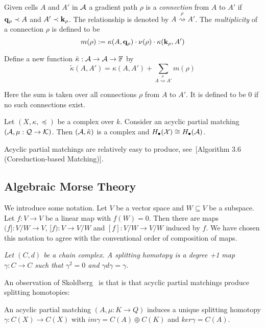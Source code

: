 Given cells $A$ and $A'$ in ${\mathcal A}$ a gradient path $\rho$ is a {\em connection} from $A$ to $A'$ if ${\bf q}_\rho\prec A$ and $A'\prec {\bf k}_\rho$.  The relationship is denoted by $A\stackrel{\rho}{\rightsquigarrow} A'$.  The {\em multiplicity} of a connection $\rho$ is defined to be $$m(\rho):= \kappa(A,{\bf q}_\rho)\cdot \nu(\rho)\cdot \kappa({\bf k}_\rho,A')$$

Define a new function $\tilde \kappa:{\mathcal A}\to {\mathcal A}\to {\mathbb{F}}$ by $$\tilde\kappa (A,A')=\kappa(A,A')+\sum_{A\stackrel{\rho}{\rightsquigarrow} A'} m(\rho)$$

Here the sum is taken over all connections $\rho$ from $A$ to $A'$.  It is defined to be 0 if no such connections exist.

\begin{prop}
Let $(X,\kappa,\preceq)$ be a complex over $k$.  Consider an acyclic partial matching $({\mathcal A},\mu:{\mathcal Q}\to {\mathcal K})$.  Then $({\mathcal A},\tilde \kappa)$ is a complex and $H_\bullet({\mathcal X})\cong H_\bullet({\mathcal A})$.
\end{prop}

Acyclic partial matchings are relatively easy to produce, see~[Algorithm 3.6 (Coreduction-based Matching)]\cite{focm}.
 

 
 \subsection{Algebraic Morse Theory}
 
 We introduce some notation.  Let $V$ be a vector space and $W\subseteq V$ be a subspace.  Let $f:V\to V$ be a linear map with $f(W)=0$.  Then there are maps $(f]:V/W\to V$, $[f):V\to V/W$ and $[f]:V/W\to V/W$ induced by $f$.   We have chosen this notation to agree with the conventional order of composition of maps.

\begin{defn}
{\em
Let $(C,d)$ be a chain complex.  A {\em splitting homotopy} is a degree +1 map $\gamma:C\to C$ such that $\gamma^2=0$ and $\gamma d\gamma = \gamma$.
}
\end{defn}


An observation of Skoldberg~\cite{sko} is that is that acyclic partial matchings produce splitting homotopies:

\begin{prop}\label{prop:matchinghomotopy}
An acyclic partial matching $(A,\mu:K\to Q)$ induces a unique splitting homotopy $\gamma:C(X)\to C(X)$ with $im\gamma = C(A)\oplus C(K)$ and $ker\gamma = C(A)$.
\end{prop}

